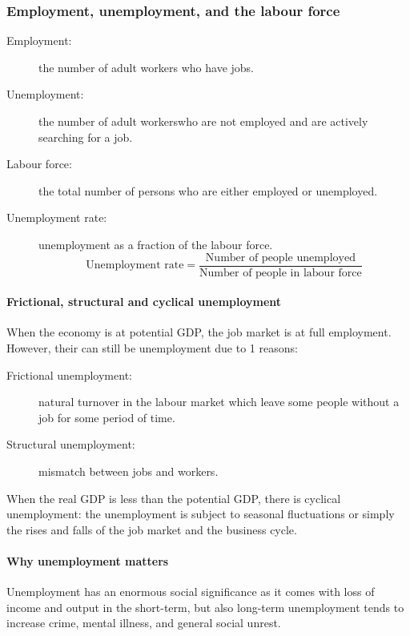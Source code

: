 \documentclass[10pt, twocolumn]{article}
\begin{document}
\subsubsection{Employment, unemployment, and the labour force}
\begin{description}
  \item[Employment:] the number of adult workers \footnotemark[1] who have jobs.
  \item[Unemployment:] the number of adult workers\footnotemark[1] who are not employed and are actively searching for a job.
  \item[Labour force:] the total number of persons who are either employed or unemployed.
  \item[Unemployment rate:] unemployment as a fraction of the labour force.
        \[
          \text{Unemployment rate} = \frac{\text{Number of people unemployed}}{\text{Number of people in labour force}}
        \]
\end{description}


\paragraph{Frictional, structural and cyclical unemployment}
When the economy is at potential GDP, the job market is at full employment.
However, their can still be unemployment due to 1 reasons:
\begin{description}
  \item[Frictional unemployment:] natural turnover in the labour market which leave some people without a job for some period of time.
  \item[Structural unemployment:] mismatch between jobs and workers.
\end{description}

When the real GDP is less than the potential GDP, there is cyclical unemployment: the unemployment is subject to seasonal fluctuations or simply the rises and falls of the job market and the business cycle.


\paragraph{Why unemployment matters}
Unemployment has an enormous social significance as it comes with loss of income and output in the short-term, but also long-term unemployment tends to increase crime, mental illness, and general social unrest.
\end{document}
